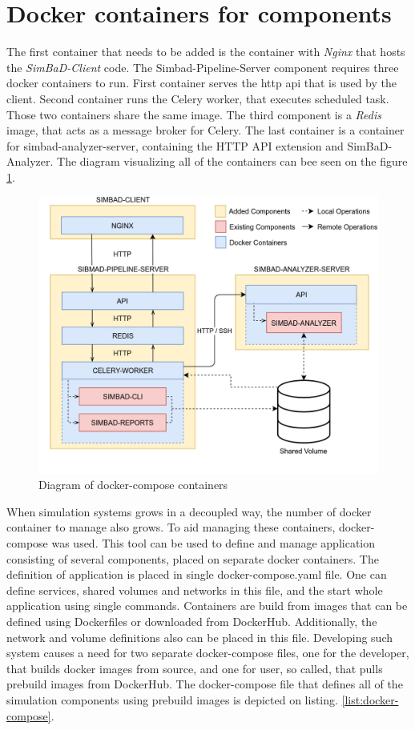 \section{Docker containers for components}
\label{section:containers}
The first container that needs to be added is the container with \textit{Nginx} that hosts the \textit{SimBaD-Client} code. The Simbad-Pipeline-Server component requires three docker containers to run. First container serves the http api that is used by the client. Second container runs the Celery worker, that executes scheduled task. Those two containers share the same image. The third component is a \textit{Redis} image, that acts as a message broker for Celery. The last container is a container for simbad-analyzer-server, containing the HTTP API extension and SimBaD-Analyzer. The diagram visualizing all of the containers can bee seen on the figure \ref{fig:docker-containers}.
\begin{figure}[h!]
	\centering
		\includegraphics[width=0.9\linewidth]{diagrams/docker.png}
	\caption{Diagram of docker-compose containers}
	\label{fig:docker-containers}
\end{figure}
When simulation systems grows in a decoupled way, the number of docker container to manage also grows. To aid managing these containers, docker-compose was used. This tool can be used to define and manage application consisting of several components, placed on separate docker containers. The definition of application is placed in single docker-compose.yaml file. One can define services, shared volumes and networks in this file, and the start whole application using single commands. Containers are build from images that can be defined using Dockerfiles or downloaded from DockerHub. Additionally, the network and volume definitions also can be placed in this file. Developing such system causes a need for two separate docker-compose files, one for the developer, that builds docker images from source, and one for user, so called, that pulls prebuild images from DockerHub. The docker-compose file that defines all of the simulation components using prebuild images is depicted on listing.  \ref{list:docker-compose}. 
